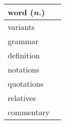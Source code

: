 \documentclass[12pt]{article}
\begin{document}
\begin{tabular}{|p{3cm}|p{10cm}|}
	\hline
	\multicolumn{2}{|l|}{
	\textbf{word} (\textit{n.}) %
	}\\
	\hline
	variants 	&		\\
	\hline
	grammar 	&		\\
	\hline
	definition 	&		\\
	\hline
	notations 	&		\\
	\hline
	quotations 	&		\\
	\hline
	relatives 	&		\\
	\hline
	commentary 	& 		\\
	\hline
\end{tabular}
\end{document}

